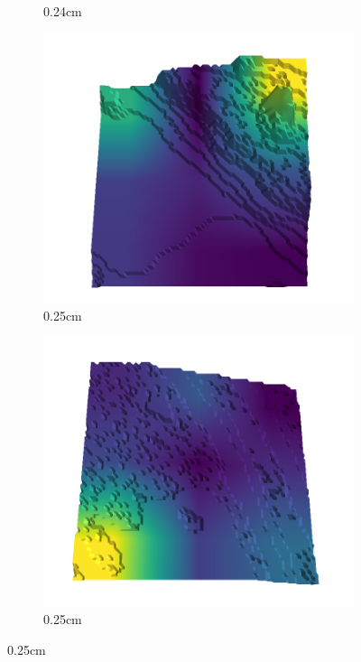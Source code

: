 \documentclass[../document.tex]{subfiles}
\begin{document}
\begin{figure}[H]
\begin{subfigure}[b]{0.242\linewidth}
            \caption{0.24cm}
            \end{subfigure}
            \begin{subfigure}[b]{0.242\linewidth}
            \includegraphics[width=\linewidth]{../img/5/quarry/false_positive/59-patch-3d-majavi-colormap-90.png}
            \caption{0.25cm}
            \end{subfigure}
            \begin{subfigure}[b]{0.242\linewidth}
            \includegraphics[width=\linewidth]{../img/5/quarry/false_positive/63-patch-3d-majavi-colormap-95.png}
            \caption{0.25cm}
            \end{subfigure}
            \end{figure}
\end{document}
